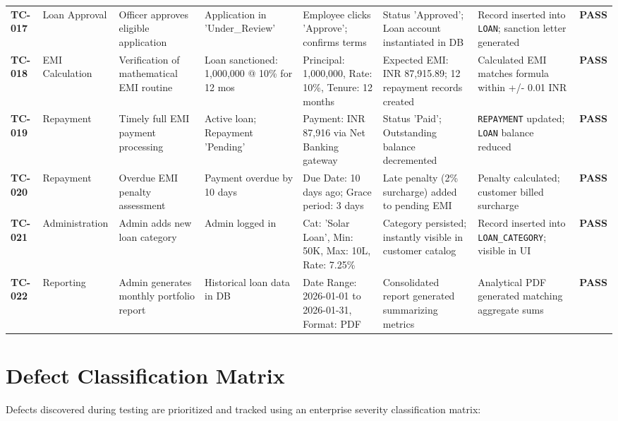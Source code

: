 \begin{table}[htbp]
{\begin{tabular}{l l l l l l l l}
\textbf{TC-017} & Loan Approval & Officer approves eligible application & Application in 'Under\_Review' & Employee clicks 'Approve'; confirms terms & Status 'Approved'; Loan account instantiated in DB & Record inserted into \texttt{LOAN}; sanction letter generated & \textbf{PASS} \\
\textbf{TC-018} & EMI Calculation & Verification of mathematical EMI routine & Loan sanctioned: 1,000,000 @ 10\% for 12 mos & Principal: 1,000,000, Rate: 10\%, Tenure: 12 months & Expected EMI: INR 87,915.89; 12 repayment records created & Calculated EMI matches formula within +/- 0.01 INR & \textbf{PASS} \\
\textbf{TC-019} & Repayment & Timely full EMI payment processing & Active loan; Repayment 'Pending' & Payment: INR 87,916 via Net Banking gateway & Status 'Paid'; Outstanding balance decremented & \texttt{REPAYMENT} updated; \texttt{LOAN} balance reduced & \textbf{PASS} \\
\textbf{TC-020} & Repayment & Overdue EMI penalty assessment & Payment overdue by 10 days & Due Date: 10 days ago; Grace period: 3 days & Late penalty (2\% surcharge) added to pending EMI & Penalty calculated; customer billed surcharge & \textbf{PASS} \\
\textbf{TC-021} & Administration & Admin adds new loan category & Admin logged in & Cat: 'Solar Loan', Min: 50K, Max: 10L, Rate: 7.25\% & Category persisted; instantly visible in customer catalog & Record inserted into \texttt{LOAN\_CATEGORY}; visible in UI & \textbf{PASS} \\
\textbf{TC-022} & Reporting & Admin generates monthly portfolio report & Historical loan data in DB & Date Range: 2026-01-01 to 2026-01-31, Format: PDF & Consolidated report generated summarizing metrics & Analytical PDF generated matching aggregate sums & \textbf{PASS} \\
\bottomrule
\end{tabular}%
}
\end{table}

\section{Defect Classification Matrix}

Defects discovered during testing are prioritized and tracked using an enterprise severity classification matrix:

